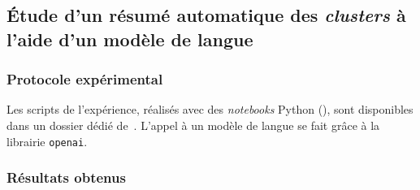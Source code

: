	\subsection{Étude d'un résumé automatique des \textit{clusters} à l'aide d'un modèle de langue}
	\label{section:4.4.3-ETUDE-PERTINENCE-RESUME-AUTOMATIQUE}
		
	
		\subsubsection{Protocole expérimental}
			
			\begin{leftBarInformation}
				Les scripts de l'expérience, réalisés avec des \textit{notebooks} Python (\cite{van-rossum-drake:2009:python-reference-manual}), sont disponibles dans un dossier dédié de~\cite{schild:2021:cognitivefactory-interactiveclusteringcomparativestudy}.
				L'appel à un modèle de langue se fait grâce à la librairie \texttt{openai}.
			\end{leftBarInformation}

		\subsubsection{Résultats obtenus}
		
			
			
